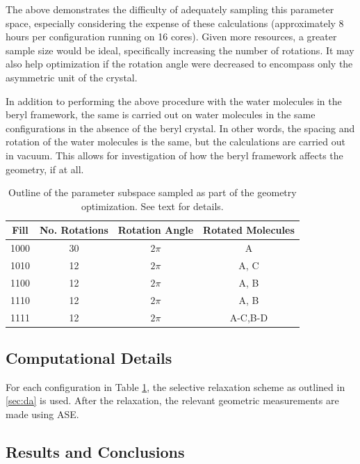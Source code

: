    The above demonstrates the difficulty of adequately sampling this parameter space, especially considering the expense of these calculations (approximately 8 hours per configuration running on 16 cores). Given more resources, a greater sample size would be ideal, specifically increasing the number of rotations. It may also help optimization if the rotation angle were decreased to encompass only the asymmetric unit of the crystal.
    
    In addition to performing the above procedure with the water molecules in the beryl framework, the same is carried out on water molecules in the same configurations in the absence of the beryl crystal. In other words, the spacing and rotation of the water molecules is the same, but the calculations are carried out in vacuum. This allows for investigation of how the beryl framework affects the geometry, if at all.
    
    \begin{table}[]
        \centering
        \begin{tabular}{c|c|c|c}
            Fill & No. Rotations & Rotation Angle  & Rotated Molecules  \\
            \hline
            \hline
            1000 & 30 & $2\pi$ & A \\
            1010 & 12 & $2\pi$ & A, C \\
            1100 & 12 & $2\pi$ & A, B \\
            1110 & 12 & $2\pi$ & A, B \\
            1111 & 12 & $2\pi$ & A-C,B-D \\
        \end{tabular}
        \caption{Outline of the parameter subspace sampled as part of the geometry optimization. See text for details.}
        \label{tab:param_subspace}
    \end{table}
        
        \subsection{Computational Details}
        
        For each configuration in Table \ref{tab:param_subspace}, the selective relaxation scheme as outlined in \ref{sec:da} is used. After the relaxation, the relevant geometric measurements are made using ASE. 
        
        \subsection{Results and Conclusions}
        \label{sec:geom_opt}
        
